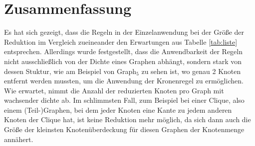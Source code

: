\section{Zusammenfassung}
\label{ch:Analyse:sec:Zusammenfassung}

Es hat sich gezeigt, dass die Regeln in der Einzelanwendung bei der Größe der Reduktion im Vergleich zueineander den Erwartungen aus Tabelle \ref{tab:liste} entsprechen. Allerdings wurde festgestellt, dass die Anwendbarkeit der Regeln nicht ausschließlich von der Dichte eines Graphen abhängt, sondern stark von dessen Stuktur, wie am Beispiel von Graph$_{5}$ zu sehen ist, wo genau 2 Knoten entfernt werden mussten, um die Anwendung der Kronenregel zu ermöglichen. Wie erwartet, nimmt die Anzahl der reduzierten Knoten pro Graph mit wachsender dichte ab. Im schlimmsten Fall, zum Beispiel bei einer Clique, also einem (Teil-)Graphen, bei dem jeder Knoten eine Kante zu jedem anderen Knoten der Clique hat, ist keine Reduktion mehr möglich, da sich dann auch die Größe der kleinsten Knotenüberdeckung für diesen Graphen der Knotenmenge annähert.


